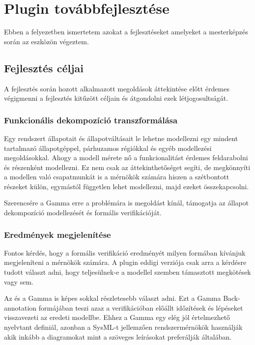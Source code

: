\chapter{Plugin továbbfejlesztése}

Ebben a felyezetben ismertetem azokat a fejlesztéseket amelyeket a mesterképzés során az eszközön végeztem.

\section{Fejlesztés céljai}

A fejlesztés során hozott alkalmazott megoldások áttekintése előtt érdemes végigmenni a fejlesztés kitűzött céljain és átgondolni ezek létjogosultságát.

\subsection{Funkcionális dekompozíció transzformálása}
Egy rendszert állapotait és állapotváltásait le lehetne modellezni egy mindent tartalmazó állapotgéppel, párhuzamos régiókkal és egyéb modellezési megoldásokkal. Ahogy a modell mérete nő a funkcionalitást érdemes feldarabolni és részenként modellezni. Ez nem csak az áttekinthetőséget segíti, de megkönnyíti a modellen való csapatmunkát is a mérnökök számára hiszen a szétbontott részeket külön, egymástól független lehet modellezni, majd ezeket összekapcsolni.

Szerencsére a Gamma erre a problémára is megoldást kínál, támogatja az állapot dekompozíció modellezését és formális verifikációját.

\subsection{Eredmények megjelenítése}
Fontos kérdés, hogy a formális verifikáció eredményét milyen formában kívánjuk megjeleníteni a mérnökök számára. A plugin eddigi verziója csak arra a kérdésre tudott választ adni, hogy teljesülnek-e a modellel szemben támasztott megkötések vagy sem.

Az \uppaal és a Gamma is képes sokkal részletesebb választ adni. Ezt a Gamma Back-annotation formájában teszi azaz a verifikációban előállt időzítések és lépéseket visszavezeti az eredeti modellbe. Ehhez a Gamma egy elég jól értelmezhető nyelvtant definiál, azonban a SysML-t jellemzően rendszermérnökök használják akik inkább a diagramokat mint a szöveges leírásokat preferálják általában.


